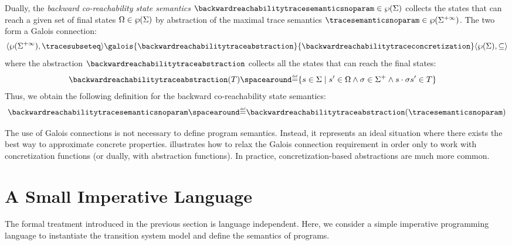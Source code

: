 \begin{example}
  Dually, the \emph{backward co-reachability state semantics} $\backwardreachabilitytracesemanticsnoparam\in\backwardreachabilitytracetype$ collects the states that can reach a given set of final states $\Omega\in\wp(\Sigma)$ by abstraction of the maximal trace semantics $\tracesemanticsnoparam\in\tracetype$. The two form a Galois connection:
  \begin{align*}
    \tuple{\tracetype}{\tracesubseteq}\galois{\backwardreachabilitytraceabstraction}{\backwardreachabilitytraceconcretization}\tuple{\backwardreachabilitytracetype}{\backwardreachabilitytracesubseteq}
  \end{align*}
  where the abstraction $\backwardreachabilitytraceabstraction$ collects all the states that can reach the final states:
  \begin{align*}
    \backwardreachabilitytraceabstraction(\defsetoftraces) &\DefeQ \setdef{\defstate\in\state}{ \defstate'\in\finalstates \land \deftrace\in\finitesequences \land \concat{\defstate}{\deftrace}{{\defstate'}} \in \defsetoftraces}
  \end{align*}
Thus, we obtain the following definition for the backward co-reachability state semantics:
\[ \backwardreachabilitytracesemanticsnoparam \DefeQ \backwardreachabilitytraceabstraction(\tracesemanticsnoparam) \]

\end{example}

\begin{remark}
  The use of Galois connections is not necessary to define program semantics. Instead, it represents an ideal situation where there exists the best way to approximate concrete properties.  illustrates how to relax the Galois connection requirement in order only to work with concretization functions (or dually, with abstraction functions). In practice, concretization-based abstractions are much more common.
\end{remark}


\section{A Small Imperative Language}

The formal treatment introduced in the previous section is language independent.
Here, we consider a simple imperative programming language to instantiate the transition system model and define the semantics of programs.

